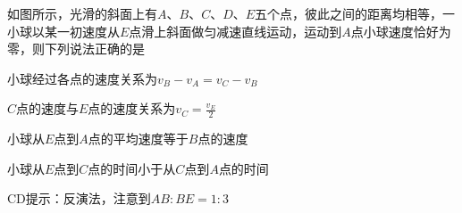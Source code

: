 如图所示，光滑的斜面上有\(A\)、\(B\)、\(C\)、\(D\)、\(E\)五个点，彼此之间的距离均相等，一小球以某一初速度从\(E\)点滑上斜面做匀减速直线运动，运动到\(A\)点小球速度恰好为零，则下列说法正确的是\paren[CD]

\begin{choices}
    \item 小球经过各点的速度关系为\(v_B - v_A = v_C - v_B\)
    \item \(C\)点的速度与\(E\)点的速度关系为\(v_C = \frac{v_E}{2}\)
    \item 小球从\(E\)点到\(A\)点的平均速度等于\(B\)点的速度
    \item 小球从\(E\)点到\(C\)点的时间小于从\(C\)点到\(A\)点的时间
\end{choices}
\begin{answer}
    CD\qquad 提示：反演法，注意到\(AB:BE = 1:3\)
\end{answer}